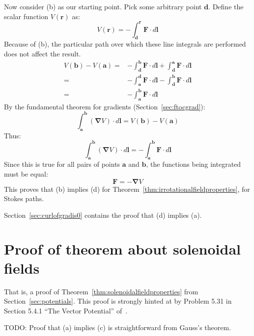 \documentclass[a4paper]{article}
\theoremstyle{plain}
\theoremstyle{definition}
\newcommand{\vect}[1]{\textbf{#1}}
\newcommand{\del}{\bm{\nabla}}
\begin{document}
Now consider (b) as our starting point.  Pick some arbitrary point
$\vect{d}$.  Define the scalar function $V(\vect{r})$ as:
\begin{equation}
V(\vect{r}) = - \int_{\vect{d}}^{\vect{r}} \vect{F} \cdot d\vect{l}
\end{equation}
Because of (b), the particular path over which these line integrals
are performed does not affect the result.
\begin{align*}
V(\vect{b}) - V(\vect{a})
  = & - \int_{\vect{d}}^{\vect{b}} \vect{F} \cdot d\vect{l}
      + \int_{\vect{d}}^{\vect{a}} \vect{F} \cdot d\vect{l} \\
  = & - \int_{\vect{a}}^{\vect{d}} \vect{F} \cdot d\vect{l}
      - \int_{\vect{d}}^{\vect{b}} \vect{F} \cdot d\vect{l} \\
  = & - \int_{\vect{a}}^{\vect{b}} \vect{F} \cdot d\vect{l}
\end{align*}
By the fundamental theorem for gradients (Section~\ref{sec:ftocgrad}):
\begin{equation}
\int_{\vect{a}}^{\vect{b}} (\del V) \cdot d\vect{l} = V(\vect{b}) - V(\vect{a})
\end{equation}
Thus:
\begin{equation}
       \int_{\vect{a}}^{\vect{b}} (\del V) \cdot d\vect{l}
   = - \int_{\vect{a}}^{\vect{b}} \vect{F} \cdot d\vect{l}
\end{equation}
Since this is true for all pairs of points $\vect{a}$ and $\vect{b}$,
the functions being integrated must be equal:
\begin{equation}
\vect{F} = - \del V
\end{equation}
This proves that (b) implies (d) for
Theorem~\ref{thm:irrotationalfieldproperties}, for Stokes paths.

Section~\ref{sec:curlofgradis0} contains the proof that (d) implies
(a).


\section{Proof of theorem about solenoidal fields}
\label{sec:potentialsthm2}

That is, a proof of Theorem~\ref{thm:solenoidalfieldproperties} from
Section~\ref{sec:potentials}.
This proof is strongly hinted at by Problem 5.31 in Section 5.4.1
``The Vector Potential'' of~\cite{Griffiths1998}.

TODO: Proof that (a) implies (c) is straightforward from Gauss's
theorem.
\end{document}
